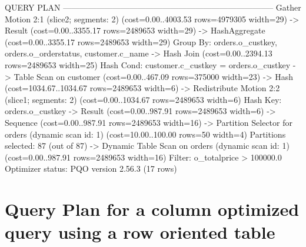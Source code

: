 \documentclass[a4paper,11pt]{report}
\begin{document}
\begin{sqlcode}
                                                       QUERY PLAN            
-----------------------------------------------------------------------------
 Gather Motion 2:1  (slice2; segments: 2)  (cost=0.00..4003.53 rows=4979305 width=29)
   ->  Result  (cost=0.00..3355.17 rows=2489653 width=29)
         ->  HashAggregate  (cost=0.00..3355.17 rows=2489653 width=29)
               Group By: orders.o_custkey, orders.o_orderstatus, customer.c_name
               ->  Hash Join  (cost=0.00..2394.13 rows=2489653 width=25)
                     Hash Cond: customer.c_custkey = orders.o_custkey
                     ->  Table Scan on customer  (cost=0.00..467.09 rows=375000 width=23)
                     ->  Hash  (cost=1034.67..1034.67 rows=2489653 width=6)
                           ->  Redistribute Motion 2:2  (slice1; segments: 2)  (cost=0.00..1034.67 rows=2489653 width=6)
                                 Hash Key: orders.o_custkey
                                 ->  Result  (cost=0.00..987.91 rows=2489653 width=6)
                                       ->  Sequence  (cost=0.00..987.91 rows=2489653 width=16)
                                             ->  Partition Selector for orders (dynamic scan id: 1)  (cost=10.00..100.00 rows=50 width=4)
                                                   Partitions selected: 87 (out of 87)
                                             ->  Dynamic Table Scan on orders (dynamic scan id: 1)  (cost=0.00..987.91 rows=2489653 width=16)
                                                   Filter: o_totalprice > 100000.0
 Optimizer status: PQO version 2.56.3
(17 rows)
\end{sqlcode}

\chapter{Query Plan for a column optimized query using a row oriented table}
\label{ap:col-better-row}
\end{document}
